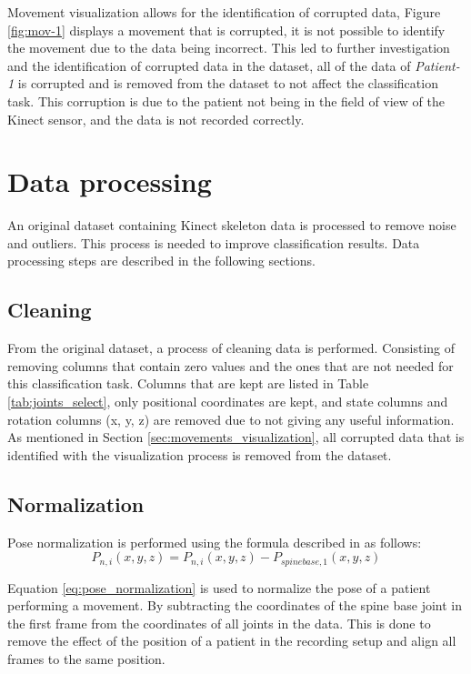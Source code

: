         Movement visualization allows for the identification of corrupted data, Figure \ref{fig:mov-1} displays a movement that is corrupted, it is not possible to identify the movement due to the data being incorrect. This led to further investigation and the identification of corrupted data in the dataset, all of the data of \textit{Patient-1} is corrupted and is removed from the dataset to not affect the classification task. This corruption is due to the patient not being in the field of view of the Kinect sensor, and the data is not recorded correctly.
        
    \section{Data processing}

        An original dataset containing Kinect skeleton data is processed to remove noise and outliers. This process is needed to improve classification results. Data processing steps are described in the following sections.
        
        \subsection{Cleaning}
        
        From the original dataset, a process of cleaning data is performed. Consisting of removing columns that contain zero values and the ones that are not needed for this classification task. Columns that are kept are listed in Table \ref{tab:joints_select}, only positional coordinates are kept, and state columns and rotation columns (x, y, z) are removed due to not giving any useful information. As mentioned in Section \ref{sec:movements_visualization},  all corrupted data that is identified with the visualization process is removed from the dataset.

        \subsection{Normalization}

        Pose normalization is performed using the formula described in \cite{maudsley-barton_comparative_2017} as follows:
        \begin{equation}
            P_{n,i}(x,y,z) = P_{n,i}(x,y,z)-P_{spinebase,1}(x,y,z)
            \label{eq:pose_normalization}
        \end{equation}

        Equation \ref{eq:pose_normalization} is used to normalize the pose of a patient performing a movement. By subtracting the coordinates of the spine base joint in the first frame from the coordinates of all joints in the data. This is done to remove the effect of the position of a patient in the recording setup and align all frames to the same position. 

